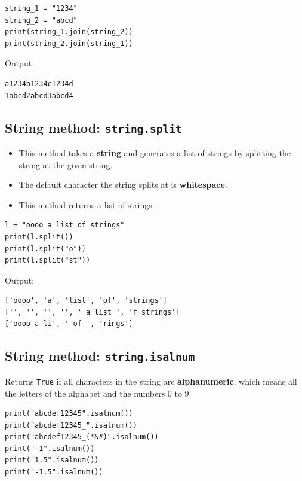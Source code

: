 \documentclass[11pt]{article}
\begin{document}
\begin{verbatim}
string_1 = "1234"
string_2 = "abcd"
print(string_1.join(string_2))
print(string_2.join(string_1))
\end{verbatim}

 \noindent Output:

\begin{verbatim}
a1234b1234c1234d
1abcd2abcd3abcd4
\end{verbatim}

\subsection{String method: \texttt{string.split}}
\label{sec:org9ab80ee}
\begin{itemize}
\item This method takes a \textbf{string} and generates a list of strings by splitting the string at the given string.
\item The default character the string splits at is \textbf{whitespace}.
\item This method returns a list of strings.
\end{itemize}

\begin{verbatim}
l = "oooo a list of strings"
print(l.split())
print(l.split("o"))
print(l.split("st"))
\end{verbatim}

 \noindent Output:

\begin{verbatim}
['oooo', 'a', 'list', 'of', 'strings']
['', '', '', '', ' a list ', 'f strings']
['oooo a li', ' of ', 'rings']
\end{verbatim}


 \newpage

\subsection{String method: \texttt{string.isalnum}}
\label{sec:org3e28dac}
Returns \texttt{True} if all characters in the string are \textbf{alphanumeric}, which means all the letters of the alphabet and the numbers 0 to 9.

\begin{verbatim}
print("abcdef12345".isalnum())
print("abcdef12345_".isalnum())
print("abcdef12345_(*&#)".isalnum())
print("-1".isalnum())
print("1.5".isalnum())
print("-1.5".isalnum())
\end{verbatim}
\end{document}
